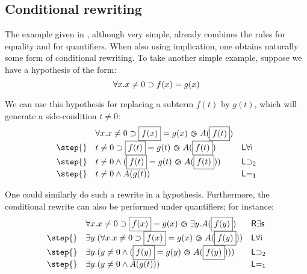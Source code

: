 \subsection{Conditional rewriting}
The example given in , although very simple,
already combines the rules for equality and for quantifiers. When also
using implication, one obtains naturally some form of conditional
rewriting. To take another simple example, suppose we have a
hypothesis of the form:
$$\forall x. x\neq 0 \supset f(x) = g(x)$$

We can use this hypothesis for replacing a subterm $f(t)$ by $g(t)$,
which will generate a side-condition $t\neq 0$:
$$
\begin{array}{lll}
  &\forall x. x\neq 0 \limp \select{f(x)} = g(x) \back A(\select{f(t)}) &\\
  \step{} & t\neq 0 \limp \select{f(t)} = g(t) \back A(\select{f(t)}) &\mathsf{L \forall i}\\
  \step{} & t\neq 0 \land (\select{f(t)} = g(t) \back A(\select{f(t)})) & \mathsf{L{\limp}_2}\\
  \step{} &  t\neq 0 \land A(g(t)) &\mathsf{L{=}_1} \\
\end{array}$$

One could similarly do such a rewrite in a hypothesis. Furthermore,
the conditional rewrite can also be performed under quantifiers; for instance:
$$
\begin{array}{lll}
  &\forall x. x\neq 0 \limp \select{f(x)} = g(x) \back \exists y . A(\select{f(y)})
  &\mathsf{R \exists s}\\
  \step{} &\exists y. ( \forall x. x\neq 0 \limp \select{f(x)} = g(x) \back A(\select{f(y)})) &\mathsf{L \forall i}\\
  \step{} & \exists y. ( y\neq 0 \land ( \select{f(y)} = g(y) \back A(\select{f(y)}) )) &\mathsf{L{\limp}_2} \\
  \step{} & \exists y .( y\neq 0 \land A(g(t))) &\mathsf{L{=}_1} \\
\end{array}$$



